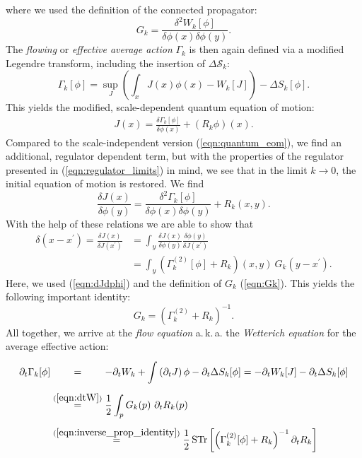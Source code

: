 where we used the definition of the connected propagator:
\begin{equation}
G_k = \frac{\delta^2 W_k[\phi]}{\delta\phi(x)\delta\phi(y)}.
\label{eqn:Gk}
\end{equation}
The \textit{flowing} or \textit{effective average action} $\Gamma_k$ is then again defined via a modified Legendre transform, including the insertion of $\Delta\mathcal{S}_k$:
\begin{equation}
	\Gamma_{k}[\phi]=\sup _{J}\left(\int_x J(x) \phi(x)-W_{k}[J]\right)-\Delta S_{k}[\phi].
\end{equation}
This yields the modified, scale-dependent quantum equation of motion:
\begin{align}
	J(x) = \frac{\delta\Gamma_k[\phi]}{\delta\phi(x)} + \left(R_k\phi\right)(x).
\end{align}
Compared to the scale-independent version (\ref{eqn:quantum_eom}), we find an additional, regulator dependent term, but with the properties of the regulator presented in (\ref{eqn:regulator_limits}) in mind, we see that in the limit $k\rightarrow 0 $, the initial equation of motion is restored.
We find
\begin{equation}
	\frac{\delta J(x)}{\delta \phi(y)}=\frac{\delta^{2} \Gamma_{k}[\phi]}{\delta \phi(x) \delta \phi(y)}+R_{k}(x, y).\label{eqn:dJdphi}
\end{equation}
With the help of these relations we are able to show that 
\begin{equation}
\begin{aligned} \delta\left(x-x^{\prime}\right) =\frac{\delta J(x)}{\delta J\left(x^{\prime}\right)}&=\int_y \frac{\delta J(x)}{\delta \phi(y)} \frac{\delta \phi(y)}{\delta J\left(x^{\prime}\right)} \\[10pt] &=\int_y\left(\Gamma_{k}^{(2)}[\phi]+R_{k}\right)(x, y) \ G_{k}\left(y-x^{\prime}\right).
\end{aligned}
\end{equation}
Here, we used (\ref{eqn:dJdphi}) and the definition of $G_k$ (\ref{eqn:Gk}). 
This yields the following important identity:
\begin{equation}
	G_k = \left(\Gamma_k^{(2)} + R_k\right)^{-1}.
	\label{eqn:inverse_prop_identity}
\end{equation}
All together, we arrive at the \textit{flow equation} a.\,k.\,a. the \textit{Wetterich equation} for the average effective action:
\begin{equation}
\begin{aligned}
\partial_t \Gamma_k[\phi] &\overset{\phantom{(\ref{eqn:dtW})}}{=} -\partial_t W_k +\int\left(\partial_t J\right) \phi - \partial_t \Delta S_k[\phi] = - \partial_t W_k[J] - \partial_t \Delta S_k[\phi] \\[5pt] 
&\overset{(\ref{eqn:dtW})}{=} \frac{1}{2} \int_p G_{k}(p) \ \partial_{t} R_{k}(p)\\[5pt]
&\overset{(\ref{eqn:inverse_prop_identity})}{=}\frac{1}{2} \operatorname{STr}\left[\left(\Gamma_{k}^{(2)}[\phi]+R_{k}\right)^{-1}\partial_{t} R_{k}\right] 
\end{aligned}
\label{eqn:Wetterich}
\end{equation}
